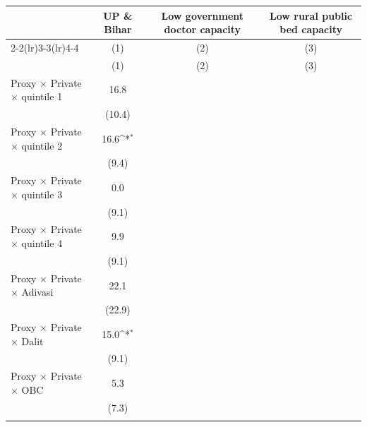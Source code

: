 {
\def\sym#1{\ifmmode^{#1}\else\(^{#1}\)\fi}
\begin{tabular}{l*{3}{c}}
\toprule
            &\multicolumn{1}{c}{UP \& Bihar}&\multicolumn{1}{c}{Low government doctor capacity}&\multicolumn{1}{c}{Low rural public bed capacity}\\\cmidrule(lr){2-2}\cmidrule(lr){3-3}\cmidrule(lr){4-4}
            &\multicolumn{1}{c}{(1)}&\multicolumn{1}{c}{(2)}&\multicolumn{1}{c}{(3)}\\
            &\multicolumn{1}{c}{(1)}&\multicolumn{1}{c}{(2)}&\multicolumn{1}{c}{(3)}\\
\midrule
Proxy $\times$ Private $\times$ quintile 1&        16.8         &                     &                     \\
            &      (10.4)         &                     &                     \\
\addlinespace
Proxy $\times$ Private $\times$ quintile 2&        16.6\sym{*}  &                     &                     \\
            &       (9.4)         &                     &                     \\
\addlinespace
Proxy $\times$ Private $\times$ quintile 3&         0.0         &                     &                     \\
            &       (9.1)         &                     &                     \\
\addlinespace
Proxy $\times$ Private $\times$ quintile 4&         9.9         &                     &                     \\
            &       (9.1)         &                     &                     \\
\addlinespace
Proxy $\times$ Private $\times$ Adivasi&        22.1         &                     &                     \\
            &      (22.9)         &                     &                     \\
\addlinespace
Proxy $\times$ Private $\times$ Dalit&        15.0\sym{*}  &                     &                     \\
            &       (9.1)         &                     &                     \\
\addlinespace
Proxy $\times$ Private $\times$ OBC&         5.3         &                     &                     \\
            &       (7.3)         &                     &                     \\
\addlinespace

\end{tabular}}
